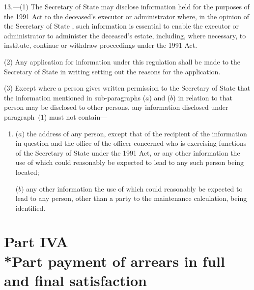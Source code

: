 \documentclass[12pt,a4paper]{article}
\begin{document}
13.---(1)  The 
Secretary of State  %
may disclose information held for the purposes of the 1991 Act to the deceased’s executor or administrator where, in the opinion of the 
Secretary of State%
, such information is essential to enable the executor or administrator to administer the deceased’s estate, including, where necessary, to institute, continue or withdraw proceedings under the 1991 Act.

(2) Any application for information under this regulation shall be made to the 
Secretary of State  %
in writing setting out the reasons for the application.

(3) Except where a person gives written permission to the 
Secretary of State  %
that the information mentioned in sub-paragraphs ($a$)  and ($b$)  in relation to that person may be disclosed to other persons, any information disclosed under paragraph~(1) must not contain—
\begin{enumerate}\item[]
($a$) the address of any person, except that of the recipient of the information in question and the office of the officer concerned who is exercising functions of the 
Secretary of State  %
under the 1991 Act, or any other information the use of which could reasonably be expected to lead to any such person being located;

($b$) any other information the use of which could reasonably be expected to lead to any person, other than a party to the maintenance calculation, being identified.
\end{enumerate}


\section[Part IVA --- Part payment of arrears in full and final satisfaction]{Part IVA\\*Part payment of arrears in full and final satisfaction}
\end{document}
